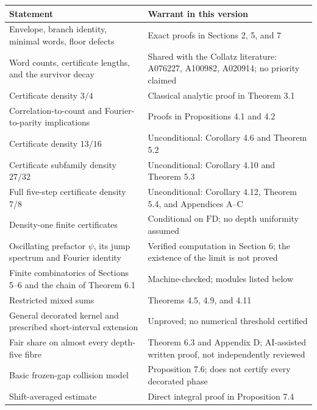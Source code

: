 \documentclass[11pt,a4paper]{article}
\begin{document}
\begin{longtable}[]{@{}
  >{\raggedright\arraybackslash}p{}
  >{\raggedright\arraybackslash}p{}@{}}
\toprule\noalign{}
\begin{minipage}[b]{\linewidth}\raggedright
Statement
\end{minipage} & \begin{minipage}[b]{\linewidth}\raggedright
Warrant in this version
\end{minipage} \\
\midrule\noalign{}
\endhead
\bottomrule\noalign{}
\endlastfoot
Envelope, branch identity, minimal words, floor defects & Exact proofs
in Sections 2, 5, and 7 \\
Word counts, certificate lengths, and the survivor decay & Shared with
the Collatz literature: A076227, A100982, A020914; no priority
claimed \\
Certificate density \(3/4\) & Classical analytic proof in Theorem 3.1 \\
Correlation-to-count and Fourier-to-parity implications & Proofs in
Propositions 4.1 and 4.2 \\
Certificate density \(13/16\) & Unconditional: Corollary 4.6 and Theorem
5.2 \\
Certificate subfamily density \(27/32\) & Unconditional: Corollary 4.10
and Theorem 5.3 \\
Full five-step certificate density \(7/8\) & Unconditional: Corollary
4.12, Theorem 5.4, and Appendices A--C \\
Density-one finite certificates & Conditional on \(\mathrm{FD}\); no
depth uniformity assumed \\
Oscillating prefactor \(\psi\), its jump spectrum and Fourier identity &
Verified computation in Section 6; the existence of the limit is not
proved \\
Finite combinatorics of Sections 5--6 and the chain of Theorem 6.1 &
Machine-checked; modules listed below \\
Restricted mixed sums & Theorems 4.5, 4.9, and 4.11 \\
General decorated kernel and prescribed short-interval extension &
Unproved; no numerical threshold certified \\
Fair share on almost every depth-five fibre & Theorem 6.3 and Appendix
D; AI-assisted written proof, not independently reviewed \\
Basic frozen-gap collision model & Proposition 7.6; does not certify
every decorated phase \\
Shift-averaged estimate & Direct integral proof in Proposition 7.4 \\
\end{longtable}
\end{document}

